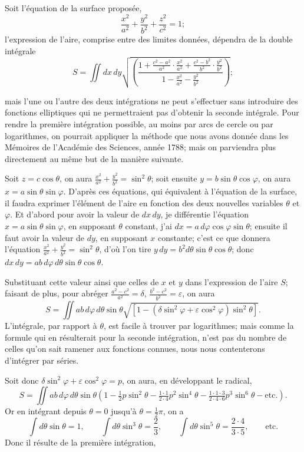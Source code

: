 \documentclass{article}
\begin{document}
Soit l'équation de la surface proposée,
\[ \frac{x^{2}}{a^{2}}+\frac{y^{2}}{b^{2}}+\frac{z^{2}}{c^{2}}=1; \]
l'expression de l'aire, comprise entre des limites données, dépendra de la double intégrale
\[ S=\iint dx\,dy\sqrt{\left(\frac{1+\frac{c^{2}-a^{2}}{a^{2}}\cdot\frac{x^{2}}{a^{2}}+\frac{c^{2}-b^{2}}{b^{2}}\cdot\frac{y^{2}}{b^{2}}}{1-\frac{x^{2}}{a^{2}}-\frac{y^{2}}{b^{2}}}\right)}; \]

mais l'une ou l'autre des deux intégrations ne peut s'effectuer sans introduire des fonctions elliptiques qui ne permettraient pas d'obtenir la seconde intégrale. Pour rendre la première intégration possible, au moins par arcs de cercle ou par logarithmes, on pourrait appliquer la méthode que nous avons donnée dans les Mémoires de l'Académie des Sciences, année 1788; mais on parviendra plus directement au même but de la manière suivante.

Soit $z=c\cos\theta$, on aura $\frac{x^{2}}{a^{2}}+\frac{y^{2}}{b^{2}}=\sin^{2}\theta$; soit ensuite $y=b\sin\theta\cos\varphi$, on aura $x=a\sin\theta\sin\varphi$. D'après ces équations, qui équivalent à l'équation de la surface, il faudra exprimer l'élément de l'aire en fonction des deux nouvelles variables $\theta$ et $\varphi$. Et d'abord pour avoir la valeur de $dx\,dy$, je différentie l'équation $x=a\sin\theta\sin\varphi$, en supposant $\theta$ constant, j'ai $dx=a\,d\varphi\cos\varphi\sin\theta$; ensuite il faut avoir la valeur de $dy$, en supposant $x$ constante; c'est ce que donnera l'équation $\frac{x^{2}}{a^{2}}+\frac{y^{2}}{b^{2}}=\sin^{2}\theta$, d'où l'on tire $y\,dy=b^{2}d\theta\sin\theta\cos\theta$; donc $dx\,dy=ab\,d\varphi\,d\theta\sin\theta\cos\theta$.

Substituant cette valeur ainsi que celles de $x$ et $y$ dans l'expression de l'aire $S$; faisant de plus, pour abréger $\frac{a^{2}-c^{2}}{a^{2}}=\delta$, $\frac{b^{2}-c^{2}}{b^{2}}=\varepsilon$, on aura
\[ S=\iint ab\,d\varphi\,d\theta\sin\theta\sqrt{[1-(\delta\sin^{2}\varphi+\varepsilon\cos^{2}\varphi)\sin^{2}\theta]}. \]
L'intégrale, par rapport à $\theta$, est facile à trouver par logarithmes; mais comme la formule qui en résulterait pour la seconde intégration, n'est pas du nombre de celles qu'on sait ramener aux fonctions connues, nous nous contenterons d'intégrer par séries.

Soit donc $\delta\sin^{2}\varphi+\varepsilon\cos^{2}\varphi=p$, on aura, en développant le radical,
\[ S=\iint ab\,d\varphi\,d\theta\sin\theta\left(1-\tfrac{1}{2}p\sin^{2}\theta-\tfrac{1\cdot1}{2\cdot4}p^{2}\sin^{4}\theta-\tfrac{1\cdot1\cdot3}{2\cdot4\cdot6}p^{3}\sin^{6}\theta-\text{etc.}\right). \]
Or en intégrant depuis $\theta=0$ jusqu'à $\theta=\frac{1}{2}\pi$, on a
\[ \int d\theta\sin\theta=1,\qquad \int d\theta\sin^{3}\theta=\frac{2}{3},\qquad \int d\theta\sin^{5}\theta=\frac{2\cdot4}{3\cdot5},\qquad \text{etc.} \]
Donc il résulte de la première intégration,
\end{document}
